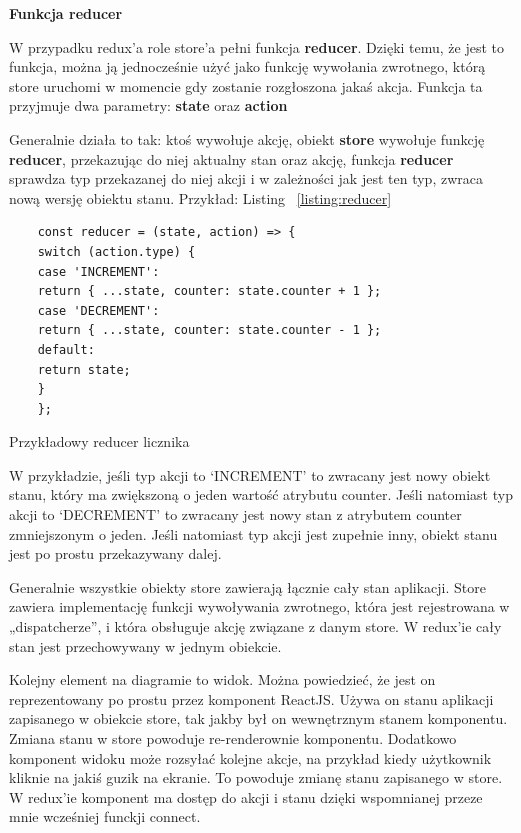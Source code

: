 \begin{center}
	\textbf{Funkcja reducer}
\end{center}

W przypadku redux'a role store'a pełni funkcja \textbf{reducer}. Dzięki temu, że jest to funkcja,
można ją jednocześnie użyć jako funkcję wywołania zwrotnego,
którą store uruchomi w momencie gdy zostanie rozgłoszona jakaś akcja.
Funkcja ta przyjmuje dwa parametry: \textbf{state} oraz \textbf{action}

Generalnie działa to tak: ktoś wywołuje akcję, obiekt \textbf{store} wywołuje funkcję \textbf{reducer},
przekazując do niej aktualny stan oraz akcję, funkcja \textbf{reducer}
sprawdza typ przekazanej do niej akcji i w zależności jak jest ten typ, zwraca nową wersję obiektu stanu.
Przykład: Listing
~\ref{listing:reducer} 

\begin{listing}
	\begin{verbatim}
	const reducer = (state, action) => {
	switch (action.type) {
	case 'INCREMENT':
	return { ...state, counter: state.counter + 1 };
	case 'DECREMENT':
	return { ...state, counter: state.counter - 1 };
	default:
	return state;
	}
	};
	\end{verbatim}
	\caption{Przykładowy reducer licznika} \label{listing:reducer}
\end{listing}

W przykładzie, jeśli typ akcji to `INCREMENT' to zwracany jest nowy obiekt stanu, który ma zwiększoną o jeden wartość atrybutu counter.
Jeśli natomiast typ akcji to `DECREMENT' to zwracany jest nowy stan z atrybutem counter zmniejszonym o jeden.
Jeśli natomiast typ akcji jest zupełnie inny, obiekt stanu jest po prostu przekazywany dalej.

Generalnie wszystkie obiekty store zawierają łącznie cały stan aplikacji.
Store zawiera implementację funkcji wywoływania zwrotnego, która jest rejestrowana w „dispatcherze”, i która obsługuje akcję związane z danym store.
W redux'ie cały stan jest przechowywany w jednym obiekcie.

Kolejny element na diagramie to widok. Można powiedzieć, że jest on reprezentowany po prostu przez komponent ReactJS\@.
Używa on stanu aplikacji zapisanego w obiekcie store, tak jakby był on wewnętrznym stanem komponentu.
Zmiana stanu w store powoduje re-renderownie komponentu.
Dodatkowo komponent widoku może rozsyłać kolejne akcje, na przykład kiedy użytkownik kliknie na jakiś guzik na ekranie.
To powoduje zmianę stanu zapisanego w store.
W redux'ie komponent ma dostęp do akcji i stanu dzięki wspomnianej przeze mnie wcześniej funckji connect.

